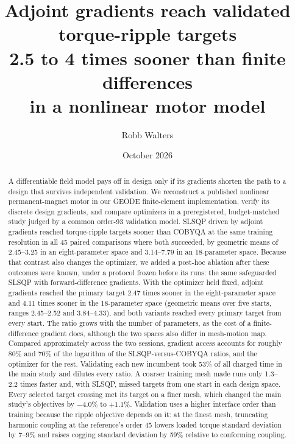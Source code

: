 \documentclass{anvil-paper}
\title{Adjoint gradients reach validated torque-ripple targets\\
2.5 to 4 times sooner than finite differences\\in a nonlinear motor model}
\author{Robb Walters}
\date{October 2026}
\begin{document}
\maketitle
\begin{abstract}
A differentiable field model pays off in design only if its gradients
shorten the path to a design that survives independent validation. We
reconstruct a published nonlinear permanent-magnet motor in our GEODE
finite-element implementation, verify its discrete design gradients, and
compare optimizers in a preregistered, budget-matched study judged by a
common order-93 validation model. SLSQP driven by adjoint gradients reached
torque-ripple targets sooner than COBYQA at the same training resolution in
all 45 paired comparisons where both succeeded, by geometric means of
2.45--3.25 in an eight-parameter space and 3.14--7.79 in an 18-parameter
space. Because that contrast also changes the optimizer, we added a
post-hoc ablation after these outcomes were known, under a protocol frozen
before its runs: the same safeguarded SLSQP with forward-difference
gradients. With the optimizer held fixed, adjoint gradients reached the
primary target 2.47 times sooner in the eight-parameter space and 4.11
times sooner in the 18-parameter space (geometric means over five starts,
ranges 2.45--2.52 and 3.84--4.33), and both variants reached every primary
target from every start. The ratio grows with the number of parameters, as
the cost of a finite-difference gradient does, although the two spaces also
differ in mesh-motion map. Compared approximately across the two sessions,
gradient access accounts for roughly 80\% and 70\% of the logarithm of the
SLSQP-versus-COBYQA ratios, and the optimizer for the rest. Validating each
new incumbent took 53\% of all charged time in the main study and dilutes
every ratio. A coarser training mesh made runs only 1.3--2.2 times faster
and, with SLSQP, missed targets from one start in each design space. Every
selected target crossing met its target on a finer mesh, which changed the
main study's objectives by $-4.0\%$ to $+1.1\%$. Validation uses a higher
interface order than training because the ripple objective depends on it:
at the finest mesh, truncating harmonic coupling at the reference's order
45 lowers loaded torque standard deviation by 7--9\% and raises cogging
standard deviation by 59\% relative to conforming coupling.
\end{abstract}
\end{document}
